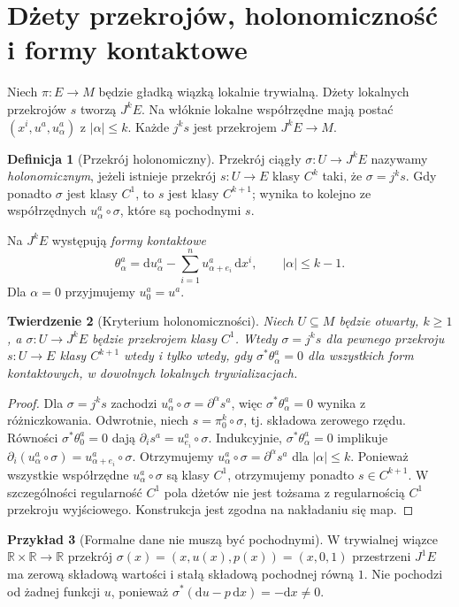 \documentclass[11pt,a4paper,oneside]{book}
\numberwithin{equation}{chapter}
\theoremstyle{plain}
\newtheorem{twierdzenie}{Twierdzenie}[chapter]
\theoremstyle{definition}
\newtheorem{definicja}[twierdzenie]{Definicja}
\newtheorem{przyklad}[twierdzenie]{Przykład}
\theoremstyle{remark}
\begin{document}
\section{Dżety przekrojów, holonomiczność i formy kontaktowe}
Niech $\pi:E\to M$ będzie gładką wiązką lokalnie trywialną.
Dżety lokalnych przekrojów $s$ tworzą $J^kE$.
Na włóknie lokalne współrzędne mają postać
$(x^i,u^a,u^a_\alpha)$ z $|\alpha|\le k$.
Każde $j^ks$ jest przekrojem $J^kE\to M$.

\begin{definicja}[Przekrój holonomiczny]
\label{def:dzety-holonomic}
Przekrój ciągły $\sigma:U\to J^kE$ nazywamy
\emph{holonomicznym}, jeżeli istnieje przekrój
$s:U\to E$ klasy $C^k$ taki, że $\sigma=j^ks$.
Gdy ponadto $\sigma$ jest klasy $C^1$, to $s$ jest
klasy $C^{k+1}$; wynika to kolejno ze współrzędnych
$u^a_\alpha\circ\sigma$, które są pochodnymi $s$.
\end{definicja}

Na $J^kE$ występują \emph{formy kontaktowe}
\[
 \theta^a_\alpha=\mathrm d u^a_\alpha
 -\sum_{i=1}^n u^a_{\alpha+e_i}\,\mathrm d x^i,
 \qquad |\alpha|\le k-1.
\]
Dla $\alpha=0$ przyjmujemy $u_0^a=u^a$.

\begin{twierdzenie}[Kryterium holonomiczności]
\label{thm:dzety-contact}
Niech $U\subseteq M$ będzie otwarty, $k\ge1$,
a $\sigma:U\to J^kE$ będzie przekrojem klasy $C^1$.
Wtedy $\sigma=j^ks$ dla pewnego przekroju
$s:U\to E$ klasy $C^{k+1}$ wtedy i tylko wtedy, gdy
$\sigma^*\theta^a_\alpha=0$ dla wszystkich form
kontaktowych, w dowolnych lokalnych trywializacjach.
\end{twierdzenie}
\begin{proof}
Dla $\sigma=j^ks$ zachodzi
$u^a_\alpha\circ\sigma=\partial^\alpha s^a$,
więc $\sigma^*\theta^a_\alpha=0$ wynika z różniczkowania.
Odwrotnie, niech $s=\pi_0^k\circ\sigma$, tj. składowa
zerowego rzędu. Równości $\sigma^*\theta^a_0=0$ dają
$\partial_i s^a=u^a_{e_i}\circ\sigma$. Indukcyjnie,
$\sigma^*\theta^a_\alpha=0$ implikuje
$\partial_i(u^a_\alpha\circ\sigma)
=u^a_{\alpha+e_i}\circ\sigma$. Otrzymujemy
$u^a_\alpha\circ\sigma=\partial^\alpha s^a$
dla $|\alpha|\le k$. Ponieważ wszystkie współrzędne $u^a_\alpha\circ\sigma$
są klasy $C^1$, otrzymujemy ponadto $s\in C^{k+1}$.
W szczególności regularność $C^1$ pola dżetów nie jest
tożsama z regularnością $C^1$ przekroju wyjściowego.
Konstrukcja jest zgodna na nakładaniu się map.
\end{proof}

\begin{przyklad}[Formalne dane nie muszą być pochodnymi]
W trywialnej wiązce $\mathbb R\times\mathbb R\to\mathbb R$
przekrój $\sigma(x)=(x,u(x),p(x))=(x,0,1)$
przestrzeni $J^1E$ ma zerową składową wartości i
stałą składową pochodnej równą $1$. Nie pochodzi od
żadnej funkcji $u$, ponieważ
$\sigma^*(\mathrm du-p\,\mathrm dx)=-\mathrm dx\ne0$.
\end{przyklad}
\end{document}
